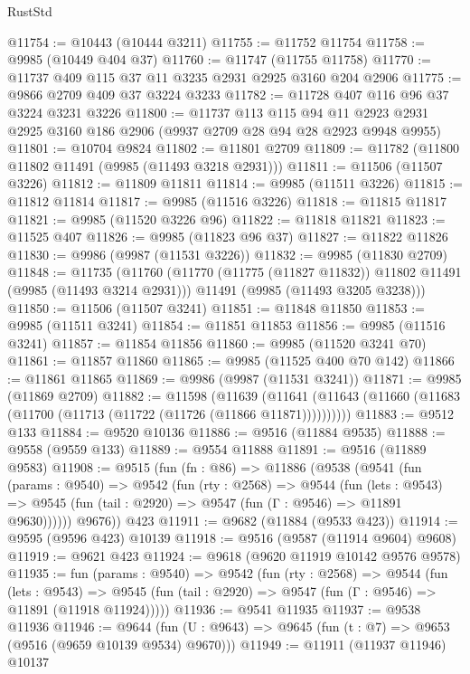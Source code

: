 \begin{lexlean}{RustStd}
\begin{coremodule}
@11754 := @10443 (@10444 @3211)
@11755 := @11752 @11754
@11758 := @9985 (@10449 @404 @37)
@11760 := @11747 (@11755 @11758)
@11770 := @11737 @409 @115 @37 @11 @3235 @2931 @2925 @3160 @204 @2906
@11775 := @9866 @2709 @409 @37 @3224 @3233
@11782 := @11728 @407 @116 @96 @37 @3224 @3231 @3226
@11800 := @11737
    @113
    @115
    @94
    @11
    @2923
    @2931
    @2925
    @3160
    @186
    @2906
    (@9937 @2709 @28 @94 @28 @2923 @9948 @9955)
@11801 := @10704 @9824
@11802 := @11801 @2709
@11809 := @11782 (@11800 @11802 @11491 (@9985 (@11493 @3218 @2931)))
@11811 := @11506 (@11507 @3226)
@11812 := @11809 @11811
@11814 := @9985 (@11511 @3226)
@11815 := @11812 @11814
@11817 := @9985 (@11516 @3226)
@11818 := @11815 @11817
@11821 := @9985 (@11520 @3226 @96)
@11822 := @11818 @11821
@11823 := @11525 @407
@11826 := @9985 (@11823 @96 @37)
@11827 := @11822 @11826
@11830 := @9986 (@9987 (@11531 @3226))
@11832 := @9985 (@11830 @2709)
@11848 := @11735
    (@11760
      (@11770 (@11775 (@11827 @11832)) @11802 @11491 (@9985 (@11493 @3214 @2931)))
      @11491
      (@9985 (@11493 @3205 @3238)))
@11850 := @11506 (@11507 @3241)
@11851 := @11848 @11850
@11853 := @9985 (@11511 @3241)
@11854 := @11851 @11853
@11856 := @9985 (@11516 @3241)
@11857 := @11854 @11856
@11860 := @9985 (@11520 @3241 @70)
@11861 := @11857 @11860
@11865 := @9985 (@11525 @400 @70 @142)
@11866 := @11861 @11865
@11869 := @9986 (@9987 (@11531 @3241))
@11871 := @9985 (@11869 @2709)
@11882 := @11598
    (@11639 (@11641 (@11643 (@11660 (@11683 (@11700 (@11713 (@11722 (@11726 (@11866 @11871))))))))))
@11883 := @9512 @133
@11884 := @9520 @10136
@11886 := @9516 (@11884 @9535)
@11888 := @9558 (@9559 @133)
@11889 := @9554 @11888
@11891 := @9516 (@11889 @9583)
@11908 := @9515
    (fun (fn : @86) =>
    @11886
      (@9538
        (@9541
          (fun (params : @9540) =>
          @9542
            (fun (rty : @2568) =>
            @9544
              (fun (lets : @9543) =>
              @9545 (fun (tail : @2920) => @9547 (fun (Γ : @9546) => @11891 @9630))))))
        @9676))
    @423
@11911 := @9682 (@11884 (@9533 @423))
@11914 := @9595 (@9596 @423) @10139
@11918 := @9516 (@9587 (@11914 @9604) @9608)
@11919 := @9621 @423
@11924 := @9618 (@9620 @11919 @10142 @9576 @9578)
@11935 := fun (params : @9540) =>
  @9542
    (fun (rty : @2568) =>
    @9544
      (fun (lets : @9543) =>
      @9545 (fun (tail : @2920) => @9547 (fun (Γ : @9546) => @11891 (@11918 @11924)))))
@11936 := @9541 @11935
@11937 := @9538 @11936
@11946 := @9644
    (fun (U : @9643) => @9645 (fun (t : @7) => @9653 (@9516 (@9659 @10139 @9534) @9670)))
@11949 := @11911 (@11937 @11946) @10137

\end{coremodule}
\end{lexlean}
